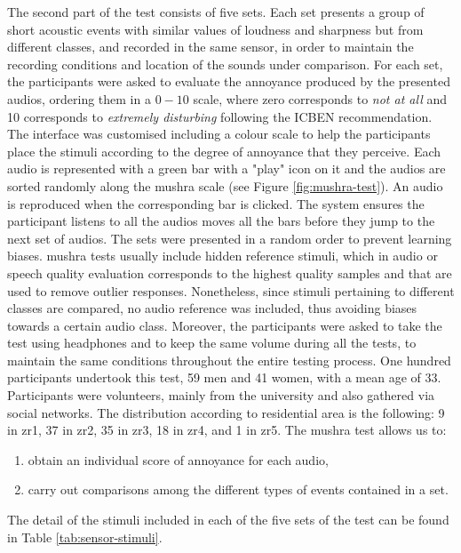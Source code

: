    The second part of the test consists of five sets. Each set presents a group of short acoustic events with similar values of loudness and sharpness but from different classes, and recorded in the same sensor, in order to maintain the recording conditions and location of the sounds under comparison. For each set, the participants were asked to evaluate the annoyance produced by the presented audios, ordering them in a $0-10$ scale, where zero corresponds to \emph{not at all} and 10 corresponds to \emph{extremely disturbing} following the ICBEN recommendation. The interface was customised including a colour scale to help the participants place the stimuli according to the degree of annoyance that they perceive. Each audio is represented with a green bar with a "play" icon on it and the audios are sorted randomly along the \gls{mushra} scale (see Figure \ref{fig:mushra-test}). An audio is reproduced when the corresponding bar is clicked. The system ensures the participant listens to all the audios moves all the bars before they jump to the next set of audios. The sets were presented in a random order to prevent learning biases. \gls{mushra} tests usually include hidden reference stimuli, which in audio or speech quality evaluation corresponds to the highest quality samples and that are used to remove outlier responses. Nonetheless, since stimuli pertaining to different classes are compared, no audio reference was included, thus avoiding biases towards a certain audio class. Moreover, the participants were asked to take the test using headphones and to keep the same volume during all the tests, to maintain the same conditions throughout the entire testing process. One hundred participants undertook this test, 59 men and 41 women, with a mean age of 33. Participants were volunteers, mainly from the university and also gathered via social networks. The distribution according to residential area is the following: 9 in zr1, 37 in zr2, 35 in zr3, 18 in zr4, and 1 in zr5. The \gls{mushra} test allows us to:

   \begin{enumerate}
     \item obtain an individual score of annoyance for each audio,
     \item carry out comparisons among the different types of events contained in a set.
   \end{enumerate}

   The detail of the stimuli included in each of the five sets of the test can be found in Table \ref{tab:sensor-stimuli}.

